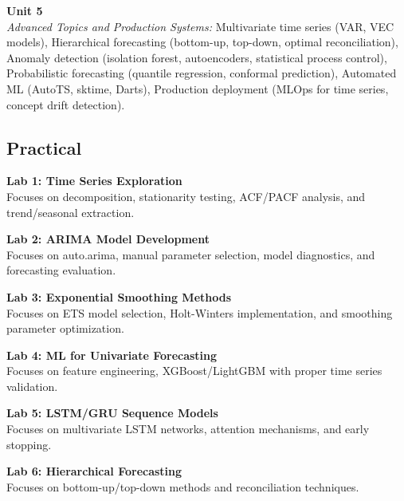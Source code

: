 \vspace{0.3cm}

\noindent\textbf{Unit 5} \\
\textit{Advanced Topics and Production Systems:} Multivariate time series (VAR, VEC models), Hierarchical forecasting (bottom-up, top-down, optimal reconciliation), Anomaly detection (isolation forest, autoencoders, statistical process control), Probabilistic forecasting (quantile regression, conformal prediction), Automated ML (AutoTS, sktime, Darts), Production deployment (MLOps for time series, concept drift detection).

\newpage

\subsection*{Practical}
\noindent\textbf{Lab 1: Time Series Exploration} \\
Focuses on decomposition, stationarity testing, ACF/PACF analysis, and trend/seasonal extraction.

\vspace{0.2cm}

\noindent\textbf{Lab 2: ARIMA Model Development} \\
Focuses on auto.arima, manual parameter selection, model diagnostics, and forecasting evaluation.

\vspace{0.2cm}

\noindent\textbf{Lab 3: Exponential Smoothing Methods} \\
Focuses on ETS model selection, Holt-Winters implementation, and smoothing parameter optimization.

\vspace{0.2cm}

\noindent\textbf{Lab 4: ML for Univariate Forecasting} \\
Focuses on feature engineering, XGBoost/LightGBM with proper time series validation.

\vspace{0.2cm}

\noindent\textbf{Lab 5: LSTM/GRU Sequence Models} \\
Focuses on multivariate LSTM networks, attention mechanisms, and early stopping.

\vspace{0.2cm}

\noindent\textbf{Lab 6: Hierarchical Forecasting} \\
Focuses on bottom-up/top-down methods and reconciliation techniques.


